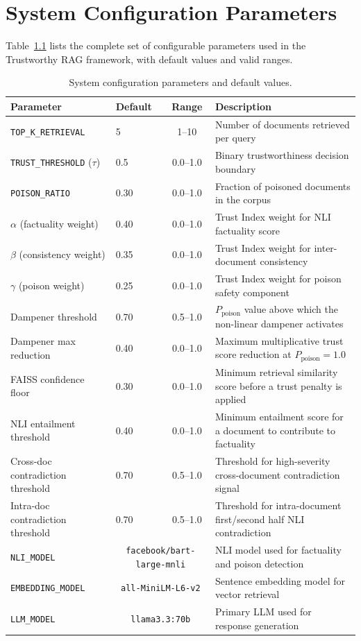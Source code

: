 \chapter{System Configuration Parameters}
\label{app:parameters}

Table~\ref{tab:app_parameters} lists the complete set of configurable parameters used in the Trustworthy RAG framework, with default values and valid ranges.

\begin{table}[h]
\centering
\caption{System configuration parameters and default values.}
\label{tab:app_parameters}
\begin{tabularx}{\textwidth}{@{}llcX@{}}
\hline
\textbf{Parameter} & \textbf{Default} & \textbf{Range} & \textbf{Description} \\
\hline
\texttt{TOP\_K\_RETRIEVAL} & 5 & 1--10 & Number of documents retrieved per query \\
\texttt{TRUST\_THRESHOLD} ($\tau$) & 0.5 & 0.0--1.0 & Binary trustworthiness decision boundary \\
\texttt{POISON\_RATIO} & 0.30 & 0.0--1.0 & Fraction of poisoned documents in the corpus \\
$\alpha$ (factuality weight) & 0.40 & 0.0--1.0 & Trust Index weight for NLI factuality score \\
$\beta$ (consistency weight) & 0.35 & 0.0--1.0 & Trust Index weight for inter-document consistency \\
$\gamma$ (poison weight) & 0.25 & 0.0--1.0 & Trust Index weight for poison safety component \\
Dampener threshold & 0.70 & 0.5--1.0 & $P_{\text{poison}}$ value above which the non-linear dampener activates \\
Dampener max reduction & 0.40 & 0.0--1.0 & Maximum multiplicative trust score reduction at $P_{\text{poison}}=1.0$ \\
FAISS confidence floor & 0.30 & 0.0--1.0 & Minimum retrieval similarity score before a trust penalty is applied \\
NLI entailment threshold & 0.40 & 0.0--1.0 & Minimum entailment score for a document to contribute to factuality \\
Cross-doc contradiction threshold & 0.70 & 0.5--1.0 & Threshold for high-severity cross-document contradiction signal \\
Intra-doc contradiction threshold & 0.70 & 0.5--1.0 & Threshold for intra-document first/second half NLI contradiction \\
\texttt{NLI\_MODEL} & \multicolumn{2}{c}{\texttt{facebook/bart-large-mnli}} & NLI model used for factuality and poison detection \\
\texttt{EMBEDDING\_MODEL} & \multicolumn{2}{c}{\texttt{all-MiniLM-L6-v2}} & Sentence embedding model for vector retrieval \\
\texttt{LLM\_MODEL} & \multicolumn{2}{c}{\texttt{llama3.3:70b}} & Primary LLM used for response generation \\
\hline
\end{tabularx}
\end{table}
